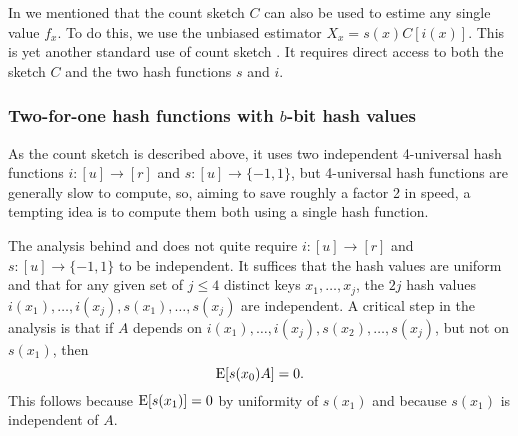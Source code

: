 In  we mentioned that the count sketch $C$ can also
be used to estime any single value $f_x$. To do this, we use
the unbiased estimator $X_x=s(x)C[i(x)]$. This is yet another standard use
of count sketch \cite{charikar04count-sketch}. It requires
direct access to both the sketch $C$ and the two hash functions $s$ and $i$.

\subsubsection{Two-for-one hash functions with \texorpdfstring{$b$}{b}-bit hash values}
As the count sketch is described above,
it uses two independent 4-universal hash functions
$i:[u]\to[r]$ and $s:[u]\to\{-1,1\}$, but 4-universal hash functions
are generally slow to compute, so, aiming to save roughly a factor 2
in speed, a tempting idea is to compute them both using a single hash
function.

The analysis behind  and  does not quite
require $i:[u]\to[r]$ and $s:[u]\to\{-1,1\}$ to be independent.
It suffices that the hash values are uniform and that for any
given set of $j\leq 4$ distinct keys $x_1,\ldots,x_j$, the $2j$ hash
values $i(x_1),\ldots,i(x_j),s(x_1),\ldots,s(x_j)$ are independent.
A critical step in the analysis is that if
$A$ depends on $i(x_1),\ldots,i(x_j),s(x_2),\ldots,s(x_j)$, but
not on $s(x_1)$, then
\begin{equation}\label{eq:E-0}
  \operatorname*{E}[s(x_0) A] = 0 .
\end{equation}
This follows because $\operatorname*{E}[s(x_1)]=0$ by uniformity of $s(x_1)$ and because $s(x_1)$ is independent of $A$.


